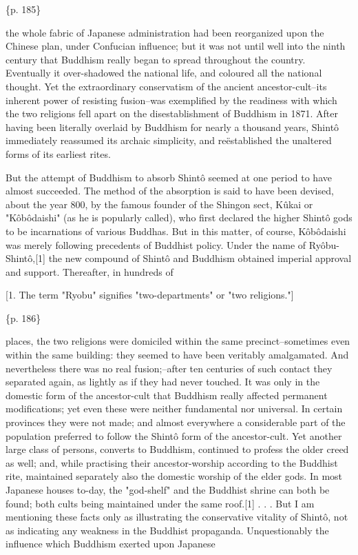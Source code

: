 \{p. 185\}

the whole fabric of Japanese administration had been reorganized upon the Chinese plan, under Confucian influence; but it was not until well into the ninth century that Buddhism really began to spread throughout the country. Eventually it over-shadowed the national life, and coloured all the national thought. Yet the extraordinary conservatism of the ancient ancestor-cult--its inherent power of resisting fusion--was exemplified by the readiness with which the two religions fell apart on the disestablishment of Buddhism in 1871. After having been literally overlaid by Buddhism for nearly a thousand years, Shintô immediately reassumed its archaic simplicity, and reëstablished the unaltered forms of its earliest rites.

But the attempt of Buddhism to absorb Shintô seemed at one period to have almost succeeded. The method of the absorption is said to have been devised, about the year 800, by the famous founder of the Shingon sect, Kûkai or "Kôbôdaishi" (as he is popularly called), who first declared the higher Shintô gods to be incarnations of various Buddhas. But in this matter, of course, Kôbôdaishi was merely following precedents of Buddhist policy. Under the name of Ryôbu-Shintô,[1] the new compound of Shintô and Buddhism obtained imperial approval and support. Thereafter, in hundreds of

[1. The term "Ryobu" signifies "two-departments" or "two religions."]

\{p. 186\}

places, the two religions were domiciled within the same precinct--sometimes even within the same building: they seemed to have been veritably amalgamated. And nevertheless there was no real fusion;--after ten centuries of such contact they separated again, as lightly as if they had never touched. It was only in the domestic form of the ancestor-cult that Buddhism really affected permanent modifications; yet even these were neither fundamental nor universal. In certain provinces they were not made; and almost everywhere a considerable part of the population preferred to follow the Shintô form of the ancestor-cult. Yet another large class of persons, converts to Buddhism, continued to profess the older creed as well; and, while practising their ancestor-worship according to the Buddhist rite, maintained separately also the domestic worship of the elder gods. In most Japanese houses to-day, the "god-shelf" and the Buddhist shrine can both be found; both cults being maintained under the same roof.[1] . . . But I am mentioning these facts only as illustrating the conservative vitality of Shintô, not as indicating any weakness in the Buddhist propaganda. Unquestionably the influence which Buddhism exerted upon Japanese

